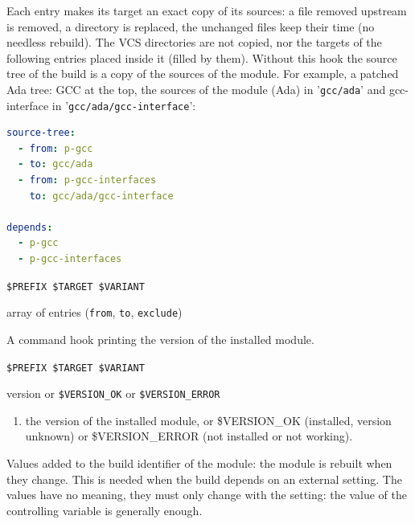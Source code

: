 \documentclass[a4paper,12pt,twoside]{article}
\newcommand{\code}[1]{\texttt{#1}}
\newcommand{\file}[1]{'{\texttt{#1}}'}
\begin{document}
\begin{description}[font=\large\texttt]
	Each entry makes its target an exact copy of its sources: a file
	removed upstream is removed, a directory is replaced, the unchanged
	files keep their time (no needless rebuild). The VCS directories are
	not copied, nor the targets of the following entries placed inside it
	(filled by them). Without this hook the source tree of the build is a
	copy of the sources of the module. For example, a patched Ada tree:
	GCC at the top, the sources of the module (Ada) in \file{gcc/ada} and
	gcc-interface in \file{gcc/ada/gcc-interface}:

	\begin{lstlisting}[language={yaml}]
source-tree:
  - from: p-gcc
  - to: gcc/ada
  - from: p-gcc-interfaces
    to: gcc/ada/gcc-interface

depends:
  - p-gcc
  - p-gcc-interfaces
	\end{lstlisting}

	\begin{description}[font=\textit,style=standard]
		\item[parameter] \tabto{2cm} \code{\$PREFIX \$TARGET \$VARIANT}
		\item[return] \tabto{2cm} array of entries (\code{from}, \code{to}, \code{exclude})
	\end{description}

	\item[version {[}<variant>{]}] A command hook printing the version of the installed module.
	\begin{description}[font=\textit,style=standard]
		\item[parameter] \tabto{2cm} \code{\$PREFIX \$TARGET \$VARIANT}
		\item[return] \tabto{2cm} version or \code{\$VERSION\_OK} or \code{\$VERSION\_ERROR}
		\begin{enumerate}
			\item the version of the installed module, or \$VERSION\_OK (installed, version unknown) or \$VERSION\_ERROR (not installed or not working).
		\end{enumerate}
	\end{description}

	\item[external-env {[}common|<variant>{]}] Values added to the build identifier of the module: the module is rebuilt when they change. This is needed when the build depends on an external setting. The values have no meaning, they must only change with the setting: the value of the controlling variable is generally enough.


\end{description}
\end{document}
